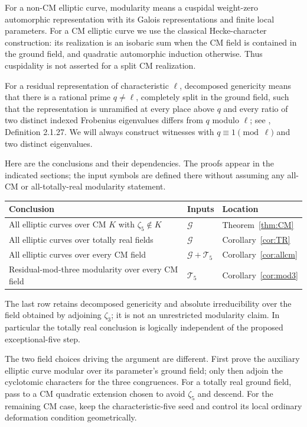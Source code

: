\documentclass[11pt,a4paper]{article}
\theoremstyle{definition}\newtheorem{definition}[theorem]{Definition}
\theoremstyle{remark}\newtheorem*{remark}{Remark}
\newcommand{\Ginput}{\mathcal G}
\newcommand{\Tinput}{\mathcal T_5}
\begin{document}
For a non-CM elliptic curve, modularity means a cuspidal weight-zero automorphic
representation with its Galois representations and finite local parameters.
For a CM elliptic curve we use the classical Hecke-character construction: its
realization is an isobaric sum when the CM field is contained in the ground
field, and quadratic automorphic induction otherwise. Thus cuspidality is not
asserted for a split CM realization.

For a residual representation of characteristic $\ell$, decomposed genericity
means that there is a rational prime $q\ne\ell$, completely split in the
ground field, such that the representation is unramified at every place above
$q$ and every ratio of two distinct indexed Frobenius eigenvalues differs from
$q$ modulo $\ell$; see \cite{CN}, Definition 2.1.27. We will always construct
witnesses with $q\equiv1\pmod\ell$ and two distinct eigenvalues.

Here are the conclusions and their dependencies. The proofs appear in the
indicated sections; the input symbols are defined there without assuming any
all-CM or all-totally-real modularity statement.
\begin{center}
\begin{tabular}{@{}p{.47\linewidth}p{.17\linewidth}p{.22\linewidth}@{}}
\toprule
Conclusion & Inputs & Location\\
\midrule
All elliptic curves over CM $K$ with $\zeta_5\notin K$
 & $\Ginput$ & Theorem~\ref{thm:CM}\\[3pt]
All elliptic curves over totally real fields
 & $\Ginput$ & Corollary~\ref{cor:TR}\\[3pt]
All elliptic curves over every CM field
 & $\Ginput+\Tinput$ & Corollary~\ref{cor:allcm}\\[3pt]
Residual-mod-three modularity over every CM field
 & $\Tinput$ & Corollary~\ref{cor:mod3}\\
\bottomrule
\end{tabular}
\end{center}
The last row retains decomposed genericity and absolute irreducibility over
the field obtained by adjoining $\zeta_3$; it is not an unrestricted modularity
claim. In particular the totally real conclusion is logically independent of
the proposed exceptional-five step.

The two field choices driving the argument are different. First prove the
auxiliary elliptic curve modular over its parameter's ground field; only then
adjoin the cyclotomic characters for the three congruences. For a totally real
ground field, pass to a CM quadratic extension chosen to avoid $\zeta_5$ and
descend. For the remaining CM case, keep the characteristic-five seed and
control its local ordinary deformation condition geometrically.
\end{document}
